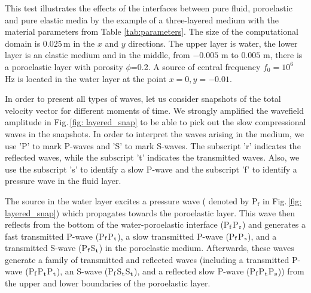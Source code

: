 \documentclass[3p,times,table]{article}
\begin{document}
This test illustrates the effects of the interfaces  between pure fluid, poroelastic 
and 
pure elastic media by the example of a three-layered medium with the material 
parameters from Table 
\ref{tab:parameters}. The size of the computational domain is $0.025$\,m in the 
$ x $ and $ y $ directions. The upper layer is water, the lower layer is an
elastic 
medium and in the middle, from $-0.005$ m to $0.005$ m, there is a poroelastic 
layer with porosity $\phi$=0.2. A source of central frequency $f_0=10^{6}$ Hz 
is located in the water layer at the point $x=0, y=-0.01$. 

In order to present all types of waves, let us consider snapshots of the total 
velocity vector  for different moments of time. We strongly amplified the 
wavefield amplitude in Fig.\,\ref{fig: layered_snap} to be able to pick out the 
slow compressional waves in the snapshots. In order to interpret the waves arising 
in the medium, we use  'P' to mark P-waves  and  'S' to 
mark S-waves. The subscript 'r'  indicates the reflected waves, while 
the subscript 't'  indicates the transmitted waves. Also, we use the 
subscript 's' to identify a slow P-wave and the subscript 'f' to identify a 
pressure wave in the fluid layer.

The source in the water layer excites a pressure wave ( denoted by P$_\textrm{f}$ in 
Fig.\,\ref{fig: 
layered_snap}) which propagates towards the poroelastic layer.
This wave then reflects from the bottom of the water-poroelastic interface 
(P$_\textrm f$P$_\textrm r$) and generates a fast transmitted P-wave 
(P$_\textrm f$P$_\textrm t$), a slow 
transmitted P-wave (P$_\textrm f$P$_\textrm s$), and a transmitted 
S-wave (P$_\textrm f$S$_\textrm t$) in the  poroelastic medium. Afterwards, 
these waves generate a 
family of transmitted and reflected waves (including a transmitted P-wave 
(P$_\textrm f$P$_\textrm t$P$_\textrm t$), an S-wave 
(P$_\textrm f$S$_\textrm t$S$_\textrm t$), and a
reflected slow P-wave (P$_\textrm f$P$_\textrm t$P$_\textrm s$)) from the  
upper and lower boundaries of 
the poroelastic layer. 
\end{document}
